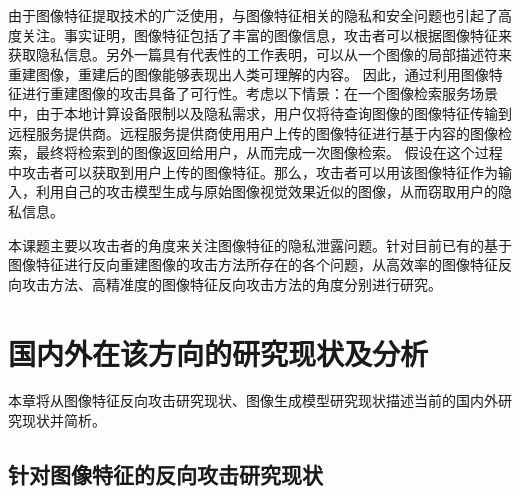 \par
由于图像特征提取技术的广泛使用，与图像特征相关的隐私和安全问题也引起了高度关注\cite{9762698}\cite{Qin2014TowardsEP}。事实证明，图像特征包括了丰富的图像信息，攻击者可以根据图像特征来获取隐私信息\cite{10214250}\cite{10.1145/3386082}。另外一篇具有代表性的工作\cite{5995616}表明，可以从一个图像的局部描述符来重建图像，重建后的图像能够表现出人类可理解的内容。
因此，通过利用图像特征进行重建图像的攻击具备了可行性。考虑以下情景：在一个图像检索服务场景中，由于本地计算设备限制以及隐私需求，用户仅将待查询图像的图像特征传输到远程服务提供商。远程服务提供商使用用户上传的图像特征进行基于内容的图像检索，最终将检索到的图像返回给用户，从而完成一次图像检索。
假设在这个过程中攻击者可以获取到用户上传的图像特征。那么，攻击者可以用该图像特征作为输入，利用自己的攻击模型生成与原始图像视觉效果近似的图像\cite{10.1145/3599589.3599596}\cite{SUN2020102642}，从而窃取用户的隐私信息。
\par
本课题主要以攻击者的角度来关注图像特征的隐私泄露问题。针对目前已有的基于图像特征进行反向重建图像的攻击方法所存在的各个问题，从高效率的图像特征反向攻击方法、高精准度的图像特征反向攻击方法的角度分别进行研究。
\section{国内外在该方向的研究现状及分析}
本章将从图像特征反向攻击研究现状、图像生成模型研究现状描述当前的国内外研究现状并简析。
\subsection{针对图像特征的反向攻击研究现状}

